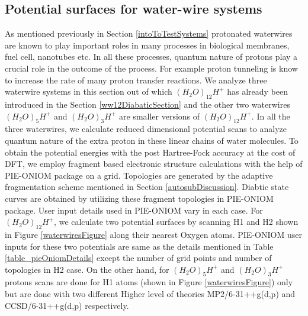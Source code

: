 \subsection{Potential surfaces for water-wire systems}
{\label {waterwireResults}}
As mentioned previously in Section \ref{intoToTestSystems} protonated waterwires are known to play important
roles in many processes in biological membranes, fuel cell, nanotubes etc.  In all these processes, quantum
nature of protons play a crucial role in the outcome of the process. For example proton tunneling is know to
increase the rate of many proton transfer reactions.
We analyze three waterwire systems in this section out of which $(H_{2}O)_{12}H^+$ has already been introduced
in the Section \ref{ww12DiabaticSection} and the other two waterwires $(H_{2}O)_5H^+$ and $(H_{2}O)_3H^+$
are smaller versions of $(H_{2}O)_{12}H^+$. In all the three waterwires, we calculate reduced dimensional
potential scans to analyze quantum nature of the extra proton in these linear chains of water molecules. To
obtain the potential energies with the post Hartree-Fock accuracy at the cost of DFT, we employ fragment
based electronic structure calculations with the help of PIE-ONIOM package on a grid.
Topologies are generated by the adaptive fragmentation scheme mentioned in Section
\ref{autosubDiscussion}. Diabtic state curves are obtained by utilizing these fragment topologies in
PIE-ONIOM package. User input details used in PIE-ONIOM vary in each case. For $(H_{2}O)_{12}H^+$, we calculate
two potential surfaces by scanning H1 and H2 shown in Figure \ref{waterwiresFigure} along their nearest Oxygen
atoms. PIE-ONIOM user inputs for these two potentials are same as the details mentioned in Table \ref{table_pieOniomDetails}
except the number of grid points and number of topologies in H2 case. On the other hand, for $(H_{2}O)_5H^+$ and
$(H_{2}O)_3H^+$ protons scans are done for H1 atoms (shown in Figure \ref{waterwiresFigure}) only but are done
with two different Higher level of theories MP2/6-31++g(d,p) and CCSD/6-31++g(d,p) respectively.

